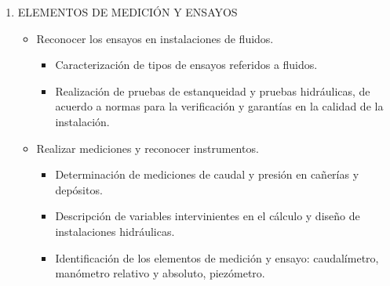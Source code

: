 \documentclass[planificacion.tex]{subfiles}
\begin{document}
\begin{enumerate}
\begin{itemize}
\begin{itemize}
        \item Aplicación de elementos en líneas de producción o sistemas en donde sea necesaria la automatización.
        \end{itemize}
    \end{itemize}
    \item ELEMENTOS DE MEDICIÓN Y ENSAYOS
    \begin{itemize}
        \item Reconocer los ensayos en instalaciones de fluidos. 
        \begin{itemize}
            \item Caracterización de tipos de ensayos referidos a fluidos.
            \item Realización de pruebas de estanqueidad y pruebas hidráulicas, de acuerdo a normas para la verificación y garantías en la calidad de la instalación. 
        \end{itemize}
        \item Realizar mediciones y reconocer instrumentos.
        \begin{itemize}
            \item  Determinación de mediciones de caudal y presión en cañerías y depósitos.
            \item Descripción de variables intervinientes en el cálculo y diseño de instalaciones hidráulicas.
            \item Identificación de los elementos de medición y ensayo: caudalímetro, manómetro relativo y absoluto, piezómetro. 
        \end{itemize}
    \end{itemize}
    
\end{enumerate}
\end{document}
